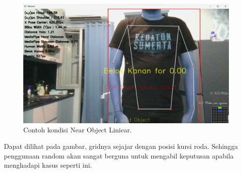 \begin{figure}[H]
    \centering
    \includegraphics[scale=0.3]{gambar/merahlinier.jpg}
    \caption{Contoh kondisi Near Object Liniear.}
    \label{fig:Near Object Linear}
\end{figure}

Dapat dilihat pada gambar, gridnya sejajar dengan posisi kursi roda. Sehingga penggunaan random akan sangat berguna untuk mengabil keputusan apabila menghadapi kasus seperti ini.

